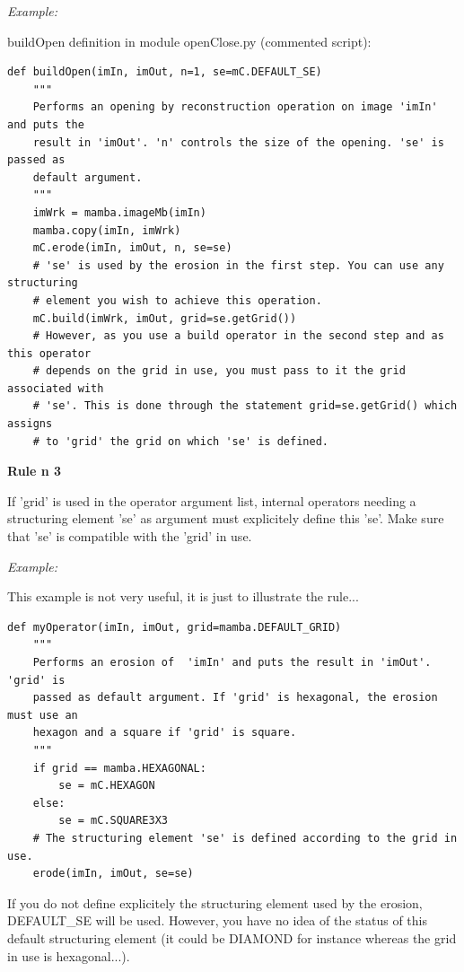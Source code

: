 \documentclass[a4paper,10pt,oneside]{article}
\begin{document}
\emph{Example:}

buildOpen definition in module openClose.py (commented script):

\lstset{language=Python}
\begin{lstlisting}
def buildOpen(imIn, imOut, n=1, se=mC.DEFAULT_SE)
    """
    Performs an opening by reconstruction operation on image 'imIn' and puts the
    result in 'imOut'. 'n' controls the size of the opening. 'se' is passed as 
    default argument.
    """
    imWrk = mamba.imageMb(imIn)
    mamba.copy(imIn, imWrk)
    mC.erode(imIn, imOut, n, se=se)
    # 'se' is used by the erosion in the first step. You can use any structuring
    # element you wish to achieve this operation.
    mC.build(imWrk, imOut, grid=se.getGrid())
    # However, as you use a build operator in the second step and as this operator
    # depends on the grid in use, you must pass to it the grid associated with 
    # 'se'. This is done through the statement grid=se.getGrid() which assigns
    # to 'grid' the grid on which 'se' is defined.
\end{lstlisting}

\par
    
\textbf{Rule n\textdegree{} 3}

If 'grid' is used in the operator argument list, internal operators needing a 
structuring element 'se' as argument must explicitely define this 'se'. Make 
sure that 'se' is compatible with the 'grid' in use.\par 

\emph{Example:}

This example is not very useful, it is just to illustrate the rule...

\lstset{language=Python}
\begin{lstlisting}
def myOperator(imIn, imOut, grid=mamba.DEFAULT_GRID)
    """
    Performs an erosion of  'imIn' and puts the result in 'imOut'. 'grid' is
    passed as default argument. If 'grid' is hexagonal, the erosion must use an 
    hexagon and a square if 'grid' is square.
    """
    if grid == mamba.HEXAGONAL:
        se = mC.HEXAGON
    else:
        se = mC.SQUARE3X3
    # The structuring element 'se' is defined according to the grid in use.
    erode(imIn, imOut, se=se)
\end{lstlisting}

If you do not define explicitely the structuring element used by the erosion, 
DEFAULT\_SE will be used. However, you have no idea of  the status of this 
default structuring element (it could be DIAMOND for instance whereas the grid 
in use is hexagonal...).
\end{document}
